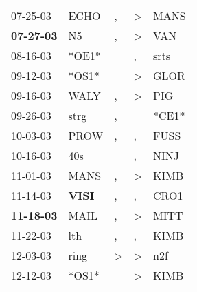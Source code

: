 \begin{supertabular}{p{0.07\textwidth}p{0.06\textwidth}p{0.02\textwidth}p{0.02\textwidth}p{0.06\textwidth}}
          07-25-03\textsuperscript{} &           ECHO\textsuperscript{} &                , &     \textgreater &           MANS\textsuperscript{} \\
 \textbf{07-27-03\textsuperscript{}} &             N5\textsuperscript{} &                , &     \textgreater &            VAN\textsuperscript{} \\
          08-16-03\textsuperscript{} &                            *OE1* &                  &                , &           srts\textsuperscript{} \\
          09-12-03\textsuperscript{} &                            *OS1* &                  &     \textgreater &           GLOR\textsuperscript{} \\
          09-16-03\textsuperscript{} &           WALY\textsuperscript{} &                , &     \textgreater &            PIG\textsuperscript{} \\
          09-26-03\textsuperscript{} &           strg\textsuperscript{} &                , &                  &                            *CE1* \\
          10-03-03\textsuperscript{} &           PROW\textsuperscript{} &                , &                , &           FUSS\textsuperscript{} \\
          10-16-03\textsuperscript{} &            40s\textsuperscript{} &                  &                , &           NINJ\textsuperscript{} \\
          11-01-03\textsuperscript{} &           MANS\textsuperscript{} &                , &     \textgreater &           KIMB\textsuperscript{} \\
          11-14-03\textsuperscript{} &  \textbf{VISI\textsuperscript{}} &                , &                , &           CRO1\textsuperscript{} \\
 \textbf{11-18-03\textsuperscript{}} &           MAIL\textsuperscript{} &                , &     \textgreater &           MITT\textsuperscript{} \\
          11-22-03\textsuperscript{} &            lth\textsuperscript{} &                , &                , &           KIMB\textsuperscript{} \\
          12-03-03\textsuperscript{} &           ring\textsuperscript{} &     \textgreater &     \textgreater &            n2f\textsuperscript{} \\
          12-12-03\textsuperscript{} &                            *OS1* &                  &     \textgreater &           KIMB\textsuperscript{} \\

\end{supertabular}
